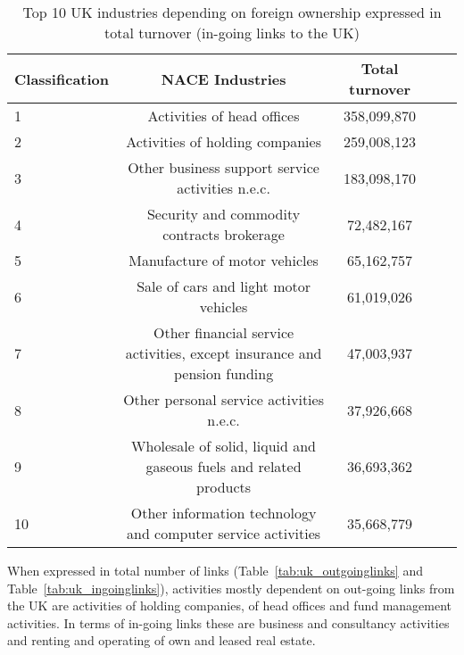 \begin{table}[!ht]
\begin{adjustwidth}{-2.25in}{0in}
\caption{Top 10 UK industries depending on foreign ownership expressed in total turnover (in-going links to the UK)\label{tab:uk_ingoing}}
\centering
\medskip
\begin{tabular}{|l|c|c|c|c|}
\hline
Classification  & NACE Industries & Total turnover \\ 
\hline
1 &      Activities of head offices &  358,099,870  \\
\hline
2 & Activities of holding companies  & 259,008,123  \\
\hline
3 & Other business support service activities n.e.c. & 183,098,170 \\
\hline
4 &  Security and commodity contracts brokerage  &  72,482,167 \\
\hline
5 &  Manufacture of motor vehicles  &   65,162,757 \\
\hline
6 &  Sale of cars and light motor vehicles  &    61,019,026  \\
\hline
7 &  Other financial service activities, except insurance and pension funding & 47,003,937 \\
\hline
8 &  Other personal service activities n.e.c.  & 37,926,668  \\
\hline
9 &  Wholesale of solid, liquid and gaseous fuels and related products & 36,693,362 \\
\hline
10 &  Other information technology and computer service activities  &  35,668,779 \\
\hline
\end{tabular}
\end{adjustwidth}
\end{table}

\newpage
When expressed in total number of links (Table~\ref{tab:uk_outgoinglinks} and Table~\ref{tab:uk_ingoinglinks}), activities mostly dependent on out-going links from the UK are activities of holding companies, of head offices and fund management activities. In terms of in-going links these are business and consultancy activities and renting and operating of own and leased real estate.

